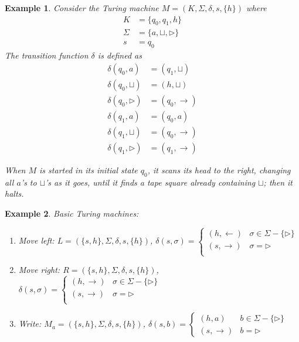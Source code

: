 \documentclass[aps,pra,onecolumn,notitlepage,superscriptaddress]{revtex4-1}
\def\l{\leftarrow}
\def\r{\rightarrow}
\newtheorem{exa}{Example}
\begin{document}
    \begin{exa}
        Consider the Turing machine $M = (K, \Sigma, \delta, s, \{h\})$ where 
        \begin{align*}
            K &= \{ q_0, q_1, h \} \\
            \Sigma &= \{ a, \sqcup, \rhd \} \\
            s &= q_0
        \end{align*}
        The transition function $\delta$ is defined as
        \begin{align*}
            \delta(q_0, a)      &= (q_1, \sqcup) \\
            \delta(q_0, \sqcup) &= (h, \sqcup) \\
            \delta(q_0, \rhd)   &= (q_0, \rightarrow) \\
            \delta(q_1, a)      &= (q_0, a) \\
            \delta(q_1, \sqcup) &= (q_0, \rightarrow) \\
            \delta(q_1, \rhd)   &= (q_1, \rightarrow)
        \end{align*}

        When $M$ is started in its initial state $q_0$, it scans its head to the right, changing all $a$'s to $\sqcup$'s as it goes, until it finds a tape square already containing $\sqcup$; then it halts. 
    \end{exa}

    \begin{exa}
        Basic Turing machines:
        \begin{enumerate}
            \item Move left: $L = (\{s,h\}, \Sigma, \delta, s, \{h\})$, $\delta(s, \sigma) = \begin{cases}
                (h, \l) & \sigma \in \Sigma - \{ \rhd \} \\
                (s, \r) & \sigma = \rhd \\
            \end{cases}$
            \item Move right: $R = (\{s,h\}, \Sigma, \delta, s, \{h\})$, $\delta(s, \sigma) = \begin{cases}
                (h, \r) & \sigma \in \Sigma - \{ \rhd \} \\
                (s, \r) & \sigma = \rhd \\
            \end{cases}$
            \item Write: $M_a = (\{s,h\}, \Sigma, \delta, s, \{h\})$, $\delta(s, b) = \begin{cases}
                (h, a) & b \in \Sigma - \{ \rhd \} \\
                (s, \r) & b = \rhd
            \end{cases}$
        \end{enumerate}
    \end{exa}
\end{document}

